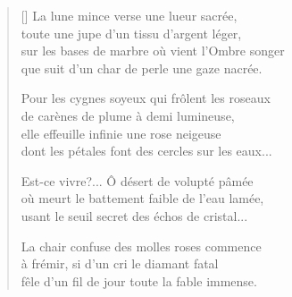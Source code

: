{\itshape
\begin{verse}[\versewidth]
  La lune mince verse une lueur sacrée, \\
  toute une jupe d'un tissu d'argent léger, \\
  sur les bases de marbre où vient l'Ombre songer \\
  que suit d'un char de perle une gaze nacrée.

  Pour les cygnes soyeux qui frôlent les roseaux \\
  de carènes de plume à demi lumineuse, \\
  elle effeuille infinie une rose neigeuse \\
  dont les pétales font des cercles sur les eaux...

  Est-ce vivre?... Ô désert de volupté pâmée \\
  où meurt le battement faible de l'eau lamée, \\
  usant le seuil secret des échos de cristal...

  La chair confuse des molles roses commence \\
  à frémir, si d'un cri le diamant fatal \\
  fêle d'un fil de jour toute la fable immense.
\end{verse}
}
